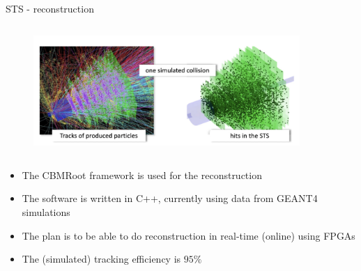 \begin{columnframe}{STS - reconstruction}
    \begin{column}{0.5\textwidth}
        \begin{figure}
            \centering
            \includegraphics[width=0.9\textwidth, frame]{images/sts_reco.png}
        \end{figure}
    \end{column}
    \begin{column}{0.5\textwidth}
        \begin{itemize}
            \item The CBMRoot framework is used for the reconstruction
            \item The software is written in C++, currently using data
                  from GEANT4 simulations
            \item The plan is to be able to do reconstruction in real-time (online) using FPGAs
            \item The (simulated) tracking efficiency is $95\%$
        \end{itemize}
    \end{column}
\end{columnframe}

